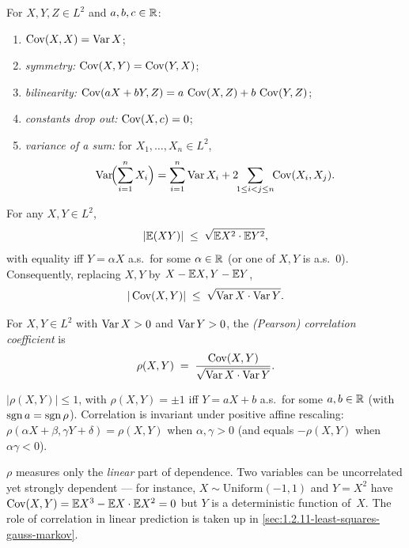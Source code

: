 \begin{proposition}
\label{prop:cov-properties}
For $X, Y, Z \in L^2$ and $a, b, c \in \mathbb{R}$:
\begin{enumerate}[label=(\alph*)]
  \item $\operatorname{Cov}(X, X) = \operatorname{Var} X$;
  \item \emph{symmetry:} $\operatorname{Cov}(X, Y) = \operatorname{Cov}(Y, X)$;
  \item \emph{bilinearity:}
        $\operatorname{Cov}(aX + bY, Z) = a\, \operatorname{Cov}(X, Z) + b\, \operatorname{Cov}(Y, Z)$;
  \item \emph{constants drop out:} $\operatorname{Cov}(X, c) = 0$;
  \item \emph{variance of a sum:} for $X_1, \dots, X_n \in L^2$,
        \[
          \operatorname{Var}\!\Bigl(\sum_{i=1}^n X_i\Bigr) = \sum_{i=1}^n \operatorname{Var} X_i + 2 \!\!\sum_{1 \leq i < j \leq n}\!\! \operatorname{Cov}(X_i, X_j).
        \]
\end{enumerate}
\end{proposition}

\begin{theorem}
\label{thm:cauchy-schwarz}
For any $X, Y \in L^2$,
\[
  |\mathbb{E}(XY)| \;\leq\; \sqrt{\mathbb{E} X^2 \cdot \mathbb{E} Y^2},
\]
with equality iff $Y = \alpha X$ a.s.\ for some $\alpha \in \mathbb{R}$
(or one of $X, Y$ is a.s.~$0$). Consequently, replacing $X, Y$ by
$X - \mathbb{E} X, Y - \mathbb{E} Y$,
\[
  |\operatorname{Cov}(X, Y)| \;\leq\; \sqrt{\operatorname{Var} X \cdot \operatorname{Var} Y}.
\]
\end{theorem}

\begin{definition}
\label{def:correlation}
For $X, Y \in L^2$ with $\operatorname{Var} X > 0$ and $\operatorname{Var} Y > 0$, the
\emph{(Pearson) correlation coefficient} is
\[
  \rho(X, Y) \;=\; \frac{\operatorname{Cov}(X, Y)}{\sqrt{\operatorname{Var} X \cdot \operatorname{Var} Y}}.
\]
\end{definition}

\begin{corollary}
\label{cor:rho-properties}
$|\rho(X, Y)| \leq 1$, with $\rho(X, Y) = \pm 1$ iff $Y = aX + b$ a.s.\
for some $a, b \in \mathbb{R}$ (with $\operatorname{sgn} a = \operatorname{sgn} \rho$). Correlation is
invariant under positive affine rescaling: $\rho(\alpha X + \beta, \gamma Y + \delta) = \rho(X, Y)$
when $\alpha, \gamma > 0$ (and equals $-\rho(X, Y)$ when
$\alpha \gamma < 0$).
\end{corollary}

\begin{remark}
$\rho$ measures only the \emph{linear} part of dependence. Two
variables can be uncorrelated yet strongly dependent — for instance,
$X \sim \mathrm{Uniform}(-1, 1)$ and $Y = X^2$ have
$\operatorname{Cov}(X, Y) = \mathbb{E} X^3 - \mathbb{E} X \cdot \mathbb{E} X^2 = 0$ but $Y$ is a
deterministic function of~$X$. The role of correlation in linear
prediction is taken up in \cref{sec:1.2.11-least-squares-gauss-markov}.
\end{remark}

